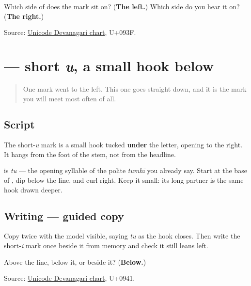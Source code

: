 \begin{tcolorbox}[breakable,colback=teal!4,colframe=teal!35!black,title={Before you move on}]
Which side of \textbf{} does the mark sit on? (\textbf{The left.}) Which side do you hear it on? (\textbf{The right.})

Source: \href{https://www.unicode.org/charts/PDF/U0900.pdf}{Unicode Devanagari chart}, U+093F.
\end{tcolorbox}
\section[\texorpdfstring{\mr{ु} (u)}{ु (u)}]{ — short \emph{u}, a small hook below}

\label{lesson:MR-W05-u-matra}



\begin{quote}
One mark went to the left. This one goes straight down, and it is the mark you will meet most often of all.
\end{quote}

\subsection*{Script}
\begin{quote}
\end{quote}

The short-\emph{u} mark is a small hook tucked \textbf{under} the letter, opening to the right. It hangs from the foot of the stem, not from the headline.

\textbf{} is \emph{tu} — the opening syllable of the polite \emph{tumhī} you already say. Start at the base of \textbf{}, dip below the line, and curl right. Keep it small: its long partner is the same hook drawn deeper.

\subsection*{Writing — guided copy}

Copy \textbf{} twice with the model visible, saying \emph{tu} as the hook closes. Then write the short-\emph{i} mark once beside it from memory and check it still leans left.

\begin{tcolorbox}[breakable,colback=teal!4,colframe=teal!35!black,title={Before you move on}]
Above the line, below it, or beside it? (\textbf{Below.})

Source: \href{https://www.unicode.org/charts/PDF/U0900.pdf}{Unicode Devanagari chart}, U+0941.
\end{tcolorbox}
